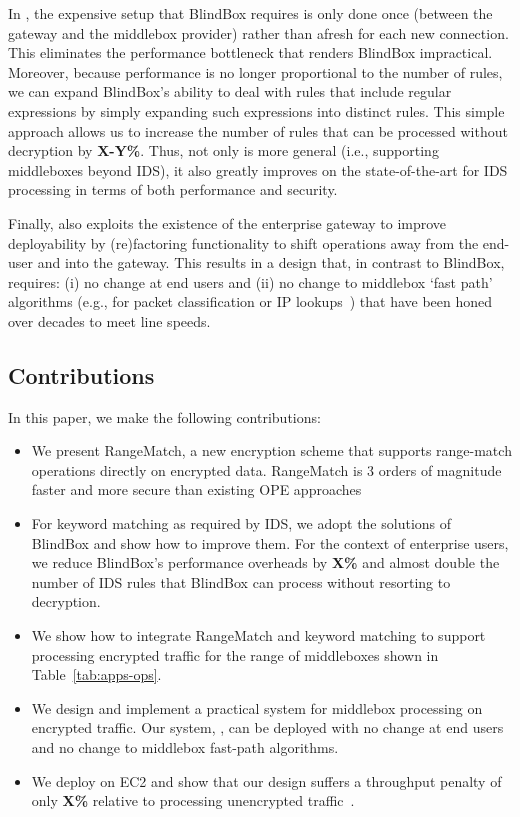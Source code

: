 In \sys, the expensive setup that BlindBox requires is only done once (between the gateway and the middlebox provider) rather 
than afresh for each new connection. This eliminates the performance bottleneck that renders BlindBox impractical. 
Moreover, because performance is no longer proportional to the number of rules, we can expand BlindBox's ability to deal with   
rules that include regular expressions by simply expanding such expressions into distinct rules. This simple approach allows us 
 to increase the number of rules that can be processed without decryption by {\bf X-Y\%}. Thus, not only is \sys more 
general (i.e., supporting middleboxes beyond IDS), it also greatly improves on the state-of-the-art for IDS processing in terms 
of both performance and security. 

Finally, \sys also exploits the existence of the enterprise gateway to improve deployability by (re)factoring functionality to shift 
operations away from the end-user and into the gateway. This results in a design that, in contrast to BlindBox, requires: (i) no 
change at end users and (ii) no change to middlebox `fast path' algorithms (e.g., for packet classification or IP lookups~\cite{varghese, mckeown, long, list}) 
that have been honed over decades to meet line speeds. 


\subsection{Contributions}
\label{sec:contributions}

In this paper, we make the following contributions: 

\begin{itemize} 
\item We present RangeMatch, a new encryption scheme that supports range-match operations directly on encrypted data. RangeMatch is 
3 orders of magnitude faster and more secure than existing OPE approaches
\item For keyword matching as required by IDS, we adopt the solutions of BlindBox and show how to improve them. For the context of enterprise 
users, we reduce BlindBox's performance overheads by {\bf X\%} and almost double the number of IDS rules that BlindBox can process without resorting 
to decryption. 
\item We show how to integrate RangeMatch and keyword matching to support processing encrypted traffic for the 
range of middleboxes shown in Table~\ref{tab:apps-ops}. 
\item We design and implement a practical system for middlebox processing on encrypted traffic. Our system, \sys,   
can be deployed with no change at end users and no change to middlebox fast-path algorithms. 
\vspace{-0.4em}
\item We deploy \sys on EC2 and show that our design suffers a throughput penalty of only {\bf X\%} relative to processing unencrypted 
traffic~\cite{aplomb}.  
\vspace{-0.4em}
\end{itemize} 

